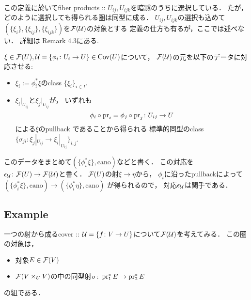 \documentclass[a4paper]{jsarticle}
\begin{document}
\begin{Remark}
    この定義に於いてfiber products :: $U_{ij}, U_{ijk}$を暗黙のうちに選択している．
    たが，どのように選択しても得られる圏は同型に成る．
    $U_{ij}, U_{ijk}$の選択も込めて
    $(\{\xi_i\}, \{\xi_{ij}\}, \{\xi_{ijk}\})$を$\mathcal{F}(\mathcal{U})$の対象とする
    定義の仕方も有るが，ここでは述べない．
    詳細は\cite{NoteGroTop} Remark 4.3にある.
\end{Remark}

\begin{Def} \label{def:epsilon}
    $\xi \in \mathcal{F}(U), \mathcal{U}=\{\phi_i \colon U_i \to U\} \in \operatorname{Cov}(U)$について，
    $\mathcal{F}(\mathcal{U})$の元を以下のデータに対応させる:
    \begin{itemize}
        \item $\xi_i:=\phi_i^*\xi$のclass $\{\xi_i\}_{i \in I}$.
        \item
            $\xi_i|_{U_{ij}}$と$\xi_j|_{U_{ij}}$が，
            いずれも
            \[ \phi_i \circ \operatorname{pr}_i=\phi_j \circ \operatorname{pr}_j \colon U_{ij} \to U \]による$\xi$のpullback
            であることから得られる
            標準的同型のclass $\{ \sigma_{ji} \colon \xi_j|_{U_{ij}} \to \xi_i|_{U_{ij}} \}_{i,j}$.
    \end{itemize}
    このデータをまとめて$(\{\phi_i^*\xi\}, \mathrm{cano})$などと書く．
    この対応を$\epsilon_{\mathcal{U}} \colon \mathcal{F}(U) \to \mathcal{F}(\mathcal{U})$と書く．
    $\mathcal{F}(U)$の射$\xi \to \eta$から，
    $\phi_i$に沿ったpullbackによって$(\{\phi_i^*\xi\}, \mathrm{cano}) \to (\{\phi_i^*\eta\}, \mathrm{cano})$
    が得られるので，
    対応$\epsilon_{\mathcal{U}}$は関手である．
\end{Def}

\subsection{Example}
\begin{Example}
    一つの射から成るcover :: $\mathcal{U}=\{f \colon V \to U\}$について$\mathcal{F}(\mathcal{U})$を考えてみる．
    この圏の対象は，
    \begin{itemize}
        \item 対象$E \in \mathcal{F}(V)$
        \item $\mathcal{F}(V \times_U V)$の中の同型射$\sigma \colon \operatorname{pr}_1^*E \to \operatorname{pr}_2^*E$
    \end{itemize}
    の組である．
\end{Example}



\end{document}
